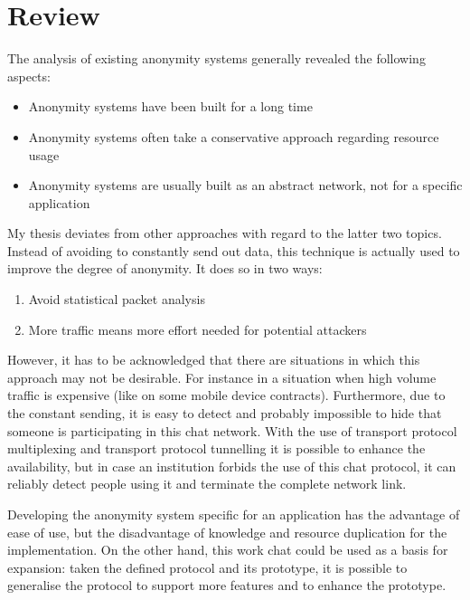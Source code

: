 \section{Review}
The analysis of existing anonymity systems generally revealed the
following aspects:
\begin{itemize}
\item Anonymity systems have been built for a long time
\item Anonymity systems often take a conservative approach regarding resource usage
\item Anonymity systems are usually built as an abstract network, not for a specific application
\end{itemize}
My thesis deviates from other approaches with regard to the latter two topics.
Instead of avoiding to constantly send out data, this technique is actually
used to improve the degree of anonymity. It does so in two ways:
\begin{enumerate}
\item Avoid statistical packet analysis
\item More traffic means more effort needed for potential attackers
\end{enumerate}
However, it has to be acknowledged that there are situations
in which this approach may not be desirable.
For instance in a situation when high volume traffic is expensive
(like on some mobile device contracts).
Furthermore, due to the constant sending, it is easy to detect and probably
impossible to hide that someone is participating in this chat network.
With the use of transport protocol multiplexing and transport protocol
tunnelling it is possible to enhance the availability, but in case an
institution forbids the use of this chat protocol, it can reliably
detect people using it and terminate the complete network link.

Developing the anonymity system specific for an application has the advantage
of ease of use, but the disadvantage of knowledge and resource duplication
for the implementation. On the other hand, this work
chat could be used as a basis for expansion: taken the
defined protocol and its prototype, it is possible to generalise
the protocol to support more features and to enhance the prototype.
